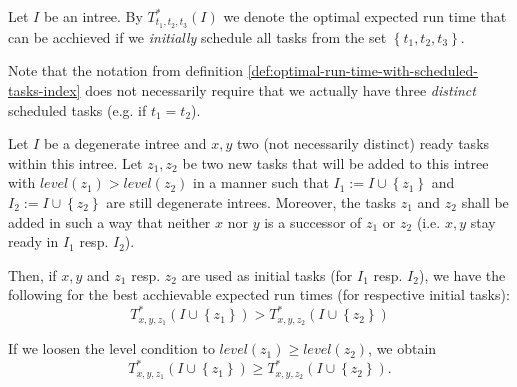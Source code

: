 \begin{definition}
  \label{def:optimal-run-time-with-scheduled-tasks-index}
  Let $I$ be an intree.
  By $T^*_{t_1,t_2,t_3}(I)$ we denote the optimal expected run time that can be acchieved if we \emph{initially} schedule all tasks from the set $\left\{ t_1,t_2,t_3 \right\}$.
\end{definition}

Note that the notation from definition  \ref{def:optimal-run-time-with-scheduled-tasks-index} does not necessarily require that we actually have three \emph{distinct} scheduled tasks (e.g. if $t_1=t_2$).

\begin{lemma}
  \label{lem:p3-adding-tasks-level-keep-scheduled-same-inequality}
  Let $I$ be a degenerate intree and $x, y$ two (not necessarily distinct) ready tasks within this intree. Let $z_1, z_2$ be two new tasks that will be added to this intree with $level(z_1) > level(z_2)$ in a manner such that $I_1:=I\cup\left\{ z_1 \right\}$ and $I_2:=I\cup\left\{ z_2 \right\}$ are still degenerate intrees. Moreover, the tasks $z_1$ and $z_2$ shall be added in such a way that neither $x$ nor $y$ is a successor of $z_1$ or $z_2$ (i.e. $x,y$ stay ready in $I_1$ resp. $I_2$). 

  Then, if $x,y$ and $z_1$ resp. $z_2$ are used as initial tasks (for $I_1$ resp. $I_2$), we have the following for the best acchievable expected run times (for respective initial tasks):
  \begin{equation}
    \label{eq:lemma-p3-adding-tasks-level-keep-scheduled-same-inequality}
    T^{*}_{x,y,z_1}\left(I\cup\left\{ z_1 \right\}\right) > T^{*}_{x,y,z_2}\left( I\cup\left\{ z_2 \right\} \right)
  \end{equation}

  If we loosen the level condition to $level(z_1)\geq level(z_2)$, we obtain
  \begin{equation*}
    T^{*}_{x,y,z_1}\left(I\cup\left\{ z_1 \right\}\right) \geq T^{*}_{x,y,z_2}\left( I\cup\left\{ z_2 \right\} \right).
  \end{equation*}
\end{lemma}

